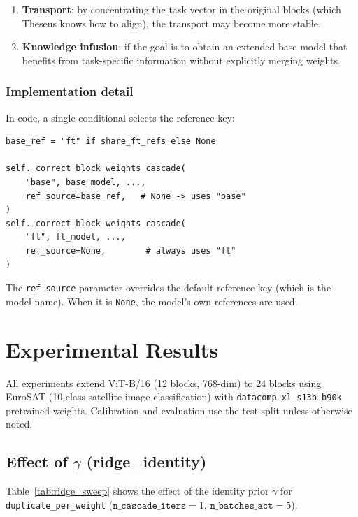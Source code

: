 \documentclass[11pt,a4paper]{article}
\begin{document}
\begin{enumerate}
    \item \textbf{Transport}: by concentrating the task vector in the
    original blocks (which Theseus knows how to align), the transport may
    become more stable.
    \item \textbf{Knowledge infusion}: if the goal is to obtain an extended
    base model that benefits from task-specific information without
    explicitly merging weights.
\end{enumerate}

\subsubsection{Implementation detail}

In code, a single conditional selects the reference key:

\begin{lstlisting}
base_ref = "ft" if share_ft_refs else None

self._correct_block_weights_cascade(
    "base", base_model, ...,
    ref_source=base_ref,   # None -> uses "base"
)
self._correct_block_weights_cascade(
    "ft", ft_model, ...,
    ref_source=None,        # always uses "ft"
)
\end{lstlisting}

The \texttt{ref\_source} parameter overrides the default reference key
(which is the model name). When it is \texttt{None}, the model's own
references are used.

\section{Experimental Results}
\label{sec:results}

All experiments extend ViT-B/16 (12 blocks, 768-dim) to 24 blocks using
EuroSAT (10-class satellite image classification) with
\texttt{datacomp\_xl\_s13b\_b90k} pretrained weights. Calibration and
evaluation use the test split unless otherwise noted.

\subsection{Effect of $\gamma$ (ridge\_identity)}
\label{subsec:ridge_sweep}

Table~\ref{tab:ridge_sweep} shows the effect of the identity prior
$\gamma$ for \texttt{duplicate\_per\_weight}
($\texttt{n\_cascade\_iters}=1$, $\texttt{n\_batches\_act}=5$).
\end{document}
